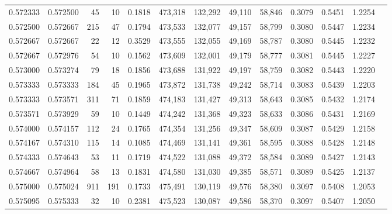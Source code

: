 \begin{tabular}{rrrrrrrrrrrrr}
0.572333 & 0.572500 &    45 &  10 &                                     0.1818 & 473,318 & 132,292 &  49,110 &  58,846 & 0.3079 & 0.5451 & 1.2254 \\
0.572500 & 0.572667 &   215 &  47 &                                     0.1794 & 473,533 & 132,077 &  49,157 &  58,799 & 0.3080 & 0.5447 & 1.2234 \\
0.572667 & 0.572667 &    22 &  12 &                                     0.3529 & 473,555 & 132,055 &  49,169 &  58,787 & 0.3080 & 0.5445 & 1.2232 \\
0.572667 & 0.572976 &    54 &  10 &                                     0.1562 & 473,609 & 132,001 &  49,179 &  58,777 & 0.3081 & 0.5445 & 1.2227 \\
0.573000 & 0.573274 &    79 &  18 &                                     0.1856 & 473,688 & 131,922 &  49,197 &  58,759 & 0.3082 & 0.5443 & 1.2220 \\
0.573333 & 0.573333 &   184 &  45 &                                     0.1965 & 473,872 & 131,738 &  49,242 &  58,714 & 0.3083 & 0.5439 & 1.2203 \\
0.573333 & 0.573571 &   311 &  71 &                                     0.1859 & 474,183 & 131,427 &  49,313 &  58,643 & 0.3085 & 0.5432 & 1.2174 \\
0.573571 & 0.573929 &    59 &  10 &                                     0.1449 & 474,242 & 131,368 &  49,323 &  58,633 & 0.3086 & 0.5431 & 1.2169 \\
0.574000 & 0.574157 &   112 &  24 &                                     0.1765 & 474,354 & 131,256 &  49,347 &  58,609 & 0.3087 & 0.5429 & 1.2158 \\
0.574167 & 0.574310 &   115 &  14 &                                     0.1085 & 474,469 & 131,141 &  49,361 &  58,595 & 0.3088 & 0.5428 & 1.2148 \\
0.574333 & 0.574643 &    53 &  11 &                                     0.1719 & 474,522 & 131,088 &  49,372 &  58,584 & 0.3089 & 0.5427 & 1.2143 \\
0.574667 & 0.574964 &    58 &  13 &                                     0.1831 & 474,580 & 131,030 &  49,385 &  58,571 & 0.3089 & 0.5425 & 1.2137 \\
0.575000 & 0.575024 &   911 & 191 &                                     0.1733 & 475,491 & 130,119 &  49,576 &  58,380 & 0.3097 & 0.5408 & 1.2053 \\
0.575095 & 0.575333 &    32 &  10 &                                     0.2381 & 475,523 & 130,087 &  49,586 &  58,370 & 0.3097 & 0.5407 & 1.2050 \\

\end{tabular}
